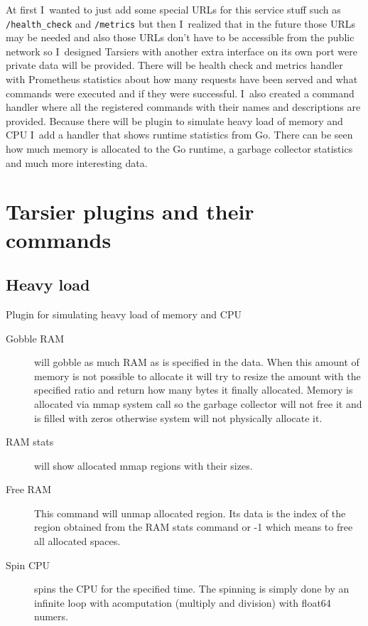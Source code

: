 At first I~wanted to just add some special URLs for this service stuff such as \lstinline{/health_check} and \lstinline{/metrics} but then I~realized that in the future those URLs may be needed and also those URLs don’t have to be accessible from the public network so I~designed Tarsiers with another extra interface on its own port were private data will be provided. There will be health check and metrics handler with Prometheus statistics about how many requests have been served and what commands were executed and if they were successful. I~also created a command handler where all the registered commands with their names and descriptions are provided. Because there will be plugin to simulate heavy load of memory and CPU I~add a handler that shows runtime statistics from Go. There can be seen how much memory is allocated to the Go runtime, a garbage collector statistics and much more interesting data.

\section{Tarsier plugins and their commands}

\subsection{Heavy load}
Plugin for simulating heavy load of memory and CPU
\begin{description}
  \item[Gobble RAM] will gobble as much RAM as is specified in the data. When this amount of memory is not possible to allocate it will try to resize the amount with the specified ratio and return how many bytes it finally allocated. Memory is allocated via mmap system call so the garbage collector will not free it and is filled with zeros otherwise system will not physically allocate it.
  \item[RAM stats] will show allocated mmap regions with their sizes.
  \item[Free RAM] This command will unmap allocated region. Its data is the index of the region obtained from the RAM stats command or -1 which means to free all allocated spaces.
  \item[Spin CPU] spins the CPU for the specified time. The spinning is simply done by an infinite loop with acomputation (multiply and division) with float64 numers.
\end{description}

